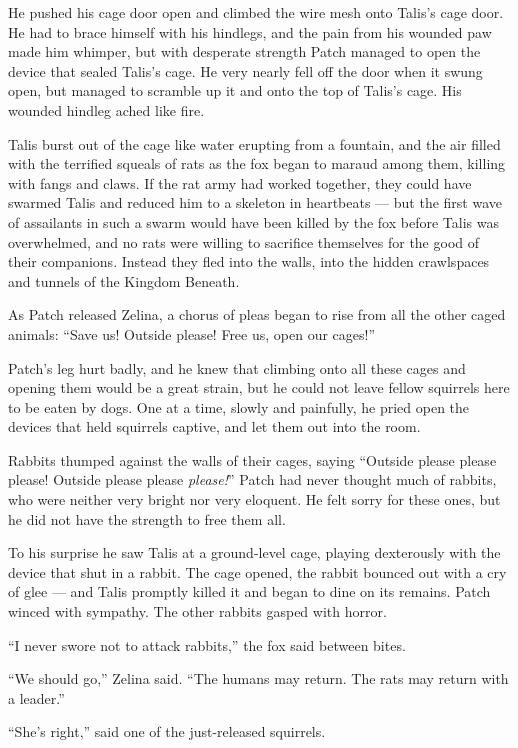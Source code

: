 \documentclass[ebook,oneside,openany,17pt]{memoir}
\begin{document}
He pushed his cage door open and climbed the wire mesh onto Talis’s
cage door. He had to brace himself with his hindlegs, and the pain
from his wounded paw made him whimper, but with desperate strength
Patch managed to open the device that sealed Talis’s cage. He very
nearly fell off the door when it swung open, but managed to scramble
up it and onto the top of Talis’s cage. His wounded hindleg ached like
fire.

Talis burst out of the cage like water erupting from a fountain, and
the air filled with the terrified squeals of rats as the fox began to
maraud among them, killing with fangs and claws. If the rat army had
worked together, they could have swarmed Talis and reduced him to a
skeleton in heartbeats — but the first wave of assailants in such a
swarm would have been killed by the fox before Talis was overwhelmed,
and no rats were willing to sacrifice themselves for the good of their
companions. Instead they fled into the walls, into the hidden
crawlspaces and tunnels of the Kingdom Beneath.

As Patch released Zelina, a chorus of pleas began to rise from all the
other caged animals: “Save us! Outside please! Free us, open our
cages!”

Patch’s leg hurt badly, and he knew that climbing onto all these cages
and opening them would be a great strain, but he could not leave
fellow squirrels here to be eaten by dogs. One at a time, slowly and
painfully, he pried open the devices that held squirrels captive, and
let them out into the room.

Rabbits thumped against the walls of their cages, saying “Outside
please please please! Outside please please \emph{please!}” Patch
had never thought much of rabbits, who were neither very bright nor
very eloquent. He felt sorry for these ones, but he did not have the
strength to free them all.

To his surprise he saw Talis at a ground-level cage, playing
dexterously with the device that shut in a rabbit. The cage opened,
the rabbit bounced out with a cry of glee — and Talis promptly killed
it and began to dine on its remains. Patch winced with sympathy. The
other rabbits gasped with horror.

“I never swore not to attack rabbits,” the fox said between bites.

“We should go,” Zelina said. “The humans may return. The rats may
return with a leader.”

“She’s right,” said one of the just-released squirrels.
\end{document}
